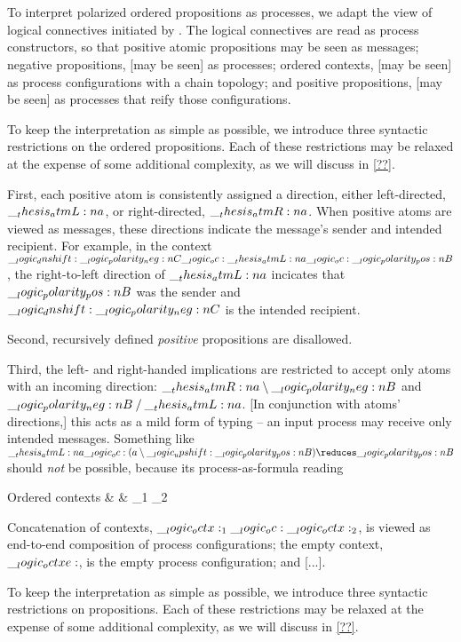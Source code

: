 \section{}

To interpret polarized ordered propositions as processes, we adapt the  view of logical connectives initiated by \textcite{??}.
The logical connectives are read as process constructors, so that positive atomic propositions may be seen as messages; negative propositions, [may be seen] as processes; ordered contexts, [may be seen] as process configurations with a chain topology; and positive propositions, [may be seen] as processes that reify those configurations.

To keep the interpretation as simple as possible, we introduce three syntactic restrictions on the ordered propositions.
Each of these restrictions may be relaxed at the expense of some additional complexity, as we will discuss in \cref{??}.

First, each positive atom is consistently assigned a direction, either left-directed, $\__thesis_atmL:n {a}$, or right-directed, $\__thesis_atmR:n {a}$.
When positive atoms are viewed as messages, these directions indicate the message's sender and intended recipient.
For example, in the context $\__logic_dnshift: \__logic_polarity_neg:n {C} \__logic_oc: \__thesis_atmL:n {a} \__logic_oc: \__logic_polarity_pos:n {B}$, the right-to-left direction of $\__thesis_atmL:n {a}$ incicates that $\__logic_polarity_pos:n {B}$ was the sender and $\__logic_dnshift: \__logic_polarity_neg:n {C}$ is the intended recipient.



Second, recursively defined \emph{positive} propositions are disallowed.

Third, the left- and right-handed implications are restricted to accept only atoms with an incoming direction: $\__thesis_atmR:n {a} \mathbin { \setminus } \__logic_polarity_neg:n {B}$ and $\__logic_polarity_neg:n {B} \mathbin { / } \__thesis_atmL:n {a}$.
[In conjunction with atoms' directions,] this acts as a mild form of typing -- an input process may receive only intended messages.
Something like $\atmL{a} \oc (a \limp \up \p{B}) \reduces \p{B}$ should \emph{not} be possible, because its process-as-formula reading


\begin{syntax*}
  Ordered contexts &
    \octx & \octx_1 \oc \octx_2 \mid \octxe \mid {}
\end{syntax*}
Concatenation of contexts, $\__logic_octx:_1 \__logic_oc: \__logic_octx:_2$, is viewed as end-to-end composition of process configurations;
the empty context, $\__logic_octxe:$, is the empty process configuration;
and [...].

To keep the interpretation as simple as possible, we introduce three syntactic restrictions on propositions.
Each of these restrictions may be relaxed at the expense of some additional complexity, as we will discuss in \cref{??}.

